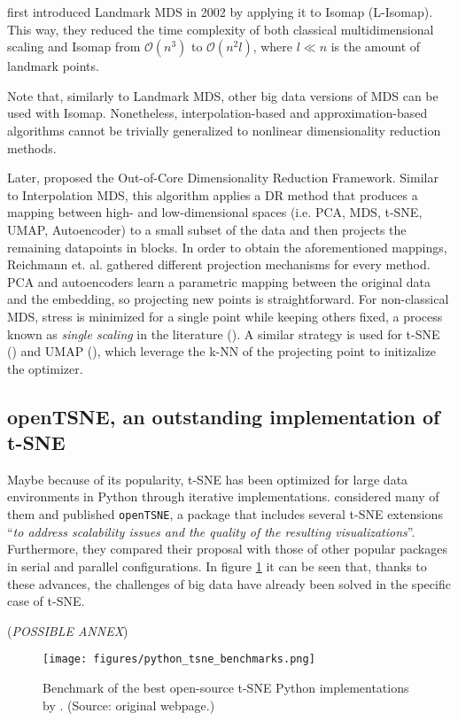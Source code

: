 \cite{Silva2002} first introduced Landmark MDS in 2002 by applying it to Isomap (L-Isomap). This way, they reduced the time complexity of both classical multidimensional scaling and Isomap from $\mathcal{O}(n^3)$ to $\mathcal{O}(n^2l)$, where $l \ll n$ is the amount of landmark points.

Note that, similarly to Landmark MDS, other big data versions of MDS can be used with Isomap. Nonetheless, interpolation-based and approximation-based algorithms cannot be trivially generalized to nonlinear dimensionality reduction methods.

Later, \cite{Reichmann2024} proposed the Out-of-Core Dimensionality Reduction Framework. Similar to Interpolation MDS, this algorithm applies a DR method that produces a mapping between high- and low-dimensional spaces (i.e. PCA, MDS, t-SNE, UMAP, Autoencoder) to a small subset of the data and then projects the remaining datapoints in blocks. In order to obtain the aforementioned mappings, Reichmann et. al. gathered different projection mechanisms for every method. PCA and autoencoders learn a parametric mapping between the original data and the embedding, so projecting new points is straightforward. For non-classical MDS, stress is minimized for a single point while keeping others fixed, a process known as \textit{single scaling} in the literature (\cite{Basalaj1999}). A similar strategy is used for t-SNE (\cite{Zhang2021}) and UMAP (\cite{McInnes2018}), which leverage the k-NN of the projecting point to initizalize the optimizer.

\subsection{openTSNE, an outstanding implementation of t-SNE}

Maybe because of its popularity, t-SNE has been optimized for large data environments in Python through iterative implementations. \cite{Policar2024} considered many of them and published \verb|openTSNE|, a package that includes several t-SNE extensions \enquote{\textit{to address scalability issues and the quality of the resulting visualizations}}. Furthermore, they compared their proposal with those of other popular packages in serial and parallel configurations. In figure \ref{fig:python_tsne_benchmarks} it can be seen that, thanks to these advances, the challenges of big data have already been solved in the specific case of t-SNE.

(\textit{POSSIBLE ANNEX})

\begin{figure}[ht]
    \centering
    \texttt{[image: figures/python\_tsne\_benchmarks.png]}
    \caption{Benchmark of the best open-source t-SNE Python implementations by \cite{Poličar2023}. (Source: original webpage.)}
    \label{fig:python_tsne_benchmarks}
\end{figure}